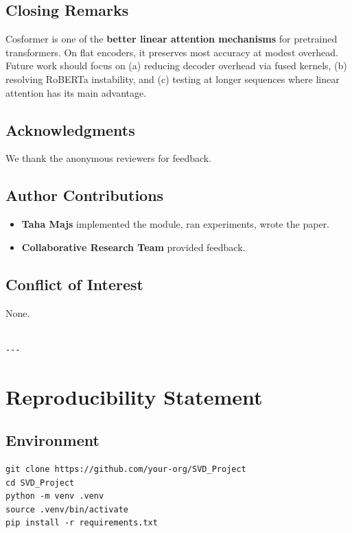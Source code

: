 \subsection{Closing Remarks}

Cosformer is one of the \textbf{better linear attention mechanisms} for 
pretrained transformers. On flat encoders, it preserves most accuracy at 
modest overhead. Future work should focus on (a) reducing decoder overhead 
via fused kernels, (b) resolving RoBERTa instability, and (c) testing at 
longer sequences where linear attention has its main advantage.

\subsection{Acknowledgments}

We thank the anonymous reviewers for feedback.

\subsection{Author Contributions}

\begin{itemize}
\item \textbf{Taha Majs} implemented the module, ran experiments, wrote the paper.
\item \textbf{Collaborative Research Team} provided feedback.

\end{itemize}
\subsection{Conflict of Interest}

None.
\begin{lstlisting}

---
\end{lstlisting}


\section{Reproducibility Statement}

\subsection{Environment}

\begin{lstlisting}
git clone https://github.com/your-org/SVD_Project
cd SVD_Project
python -m venv .venv
source .venv/bin/activate
pip install -r requirements.txt
\end{lstlisting}

